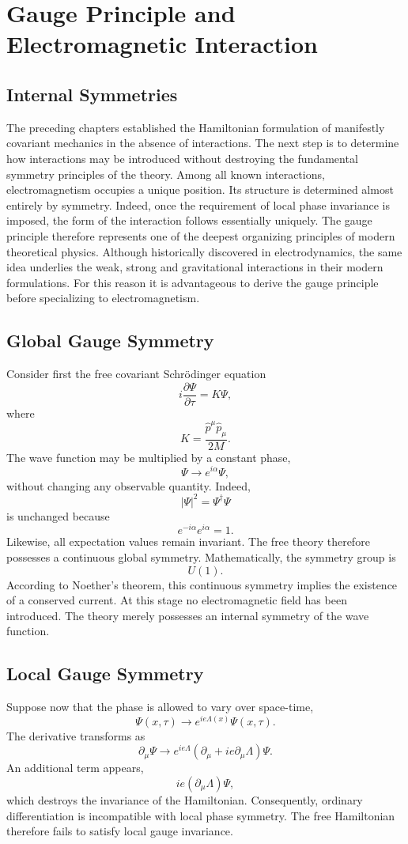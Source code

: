 \chapter{Gauge Principle and Electromagnetic Interaction}
\section{Internal Symmetries}
The preceding chapters established the Hamiltonian formulation of
manifestly covariant mechanics in the absence of interactions.
The next step is to determine how interactions may be introduced
without destroying the fundamental symmetry principles of the theory.
Among all known interactions, electromagnetism occupies a unique
position. Its structure is determined almost entirely by symmetry.
Indeed, once the requirement of local phase invariance is imposed,
the form of the interaction follows essentially uniquely.
The gauge principle therefore represents one of the deepest organizing
principles of modern theoretical physics.
Although historically discovered in electrodynamics, the same idea
underlies the weak, strong and gravitational interactions in their
modern formulations.
For this reason it is advantageous to derive the gauge principle before
specializing to electromagnetism.
\section{Global Gauge Symmetry}
Consider first the free covariant Schrödinger equation
\[i\frac{\partial\Psi}{\partial\tau}=K\Psi,\]
where
\[K=\frac{\hat p^\mu\hat p_\mu}{2M}.\]
The wave function may be multiplied by a constant phase,
\[\boxed{\Psi\rightarrow e^{i\alpha}\Psi,}\]
without changing any observable quantity.
Indeed,
\[|\Psi|^2=\Psi^\dagger\Psi\]
is unchanged because
\[e^{-i\alpha}e^{i\alpha}=1.\]
Likewise,
all expectation values remain invariant.
The free theory therefore possesses a continuous global symmetry.
Mathematically,
the symmetry group is
\[U(1).\]
According to Noether's theorem,
this continuous symmetry implies the existence of a conserved current.
At this stage no electromagnetic field has been introduced.
The theory merely possesses an internal symmetry of the wave function.
\section{Local Gauge Symmetry}
Suppose now that the phase is allowed to vary over space-time,
\[\boxed{\Psi(x,\tau)\rightarrow e^{ie\Lambda(x)}\Psi(x,\tau).}\]
The derivative transforms as
\[\partial_\mu\Psi\rightarrow e^{ie\Lambda}\left(\partial_\mu+
ie\partial_\mu\Lambda\right)\Psi.\]
An additional term appears,
\[ie(\partial_\mu\Lambda)\Psi,\]
which destroys the invariance of the Hamiltonian.
Consequently,
ordinary differentiation is incompatible with local phase symmetry.
The free Hamiltonian therefore fails to satisfy local gauge invariance.
